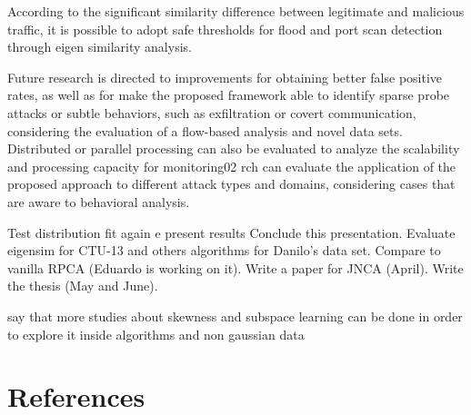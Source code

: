 \documentclass[review]{elsarticle}
\begin{document}
According to the significant similarity difference between legitimate and malicious traffic, it is possible to adopt safe thresholds for flood and port scan detection through eigen similarity analysis.

Future research is directed to improvements for obtaining better false positive rates, as well as for make the proposed framework able to identify sparse probe attacks or subtle behaviors, such as exfiltration or covert communication, considering the evaluation of a flow-based analysis and novel data sets. Distributed or parallel processing can also be evaluated to analyze the scalability and processing capacity for monitoring02       rch can evaluate the application of the proposed approach to different attack types and domains, considering cases that are aware to behavioral analysis.

Test distribution fit again e present results 
Conclude this presentation.
Evaluate eigensim for CTU-13 and others algorithms for Danilo's data set.
Compare to vanilla RPCA (Eduardo is working on it).
Write a paper for JNCA (April).
Write the thesis (May and June).

say that more studies about skewness and subspace learning can be done in order to explore it inside algorithms and non gaussian data

\section*{References}


\end{document}
